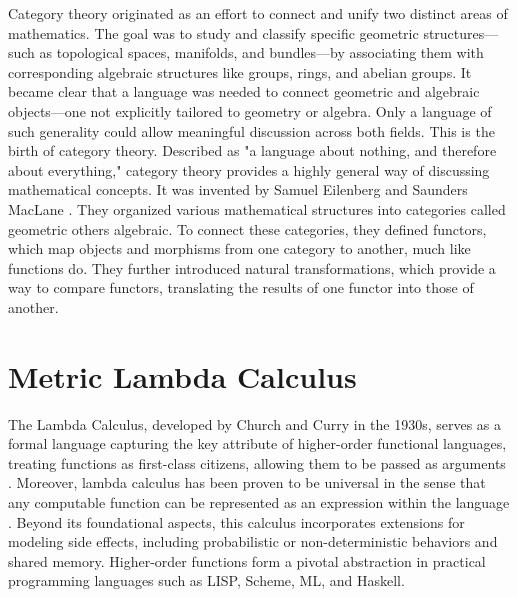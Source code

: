 Category theory originated as an effort to connect and unify two distinct areas of mathematics.  The goal was to study and classify specific geometric structures—such as topological spaces, manifolds, and bundles—by associating them with corresponding algebraic structures like groups, rings, and abelian groups. It became clear that a language was needed to connect geometric and algebraic objects—one not explicitly tailored to geometry or algebra. Only a language of such generality could allow meaningful discussion across both fields.  This is the birth of category theory.
Described as "a language about nothing, and therefore about everything," category theory provides a highly general way of discussing mathematical concepts.  It was invented by Samuel Eilenberg and Saunders MacLane \cite{eilenbergGeneralTheoryNatural1945}. They organized various mathematical structures into categories called geometric others algebraic. To connect these categories, they defined functors, which map objects and morphisms from one category to another, much like functions do. They further introduced natural transformations, which provide a way to compare functors, translating the results of one functor into those of another. \cite{yanofskyMonoidalCategoryTheory2024}


 



\chapter{Metric Lambda Calculus} \label{ch:metriclambda}

The Lambda Calculus, developed by Church and Curry in the 1930s, serves as a formal language capturing the key attribute of higher-order functional languages, treating functions as first-class citizens, allowing them to be passed as arguments \cite{barendregt1984lambda}.  Moreover, lambda calculus has been proven to be universal in the sense that any computable function can be represented as an expression within the language \cite{bernays1936alonzo} . Beyond its foundational aspects, this calculus incorporates extensions for modeling side effects, including probabilistic or non-deterministic behaviors and shared memory.  Higher-order functions form a pivotal abstraction in practical programming languages such as LISP, Scheme, ML, and Haskell.


